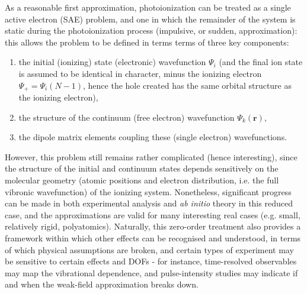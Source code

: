 \documentclass[10pt]{article}
\begin{document}
As a reasonable first approximation, photoionization can be treated as a single active electron (SAE) problem, and one in which the remainder of the system is static during the photoionization process (impulsive, or sudden, approximation): this allows the problem to be defined in terms terms of three key components: 

\begin{enumerate}
\item the initial (ionizing) state (electronic) wavefunction $\Psi_i$ (and the final ion state is assumed to be identical in character, minus the ionizing electron $\Psi_+ = \Psi_i(N-1)$, hence the hole created has the same orbital structure as the ionizing electron),
\item the structure of the continuum (free electron) wavefunction $\Psi_{k}(\bm{r})$,
\item the dipole matrix elements coupling these (single electron) wavefunctions.
\end{enumerate}


However, this problem still remains rather complicated (hence interesting), since the structure of the initial and continuum states depends sensitively on the molecular geometry (atomic positions and electron distribution, i.e. the full vibronic wavefunction) of the ionizing system. Nonetheless, significant progress can be made in both experimental analysis and \textit{ab initio} theory in this reduced case, and the approximations are valid for many interesting real cases (e.g. small, relatively rigid, polyatomics). Naturally, this zero-order treatment also provides a framework within which other effects can be recognised and understood, in terms of which physical assumptions are broken, and certain types of experiment may be sensitive to certain effects and DOFs - for instance, time-resolved observables may map the vibrational dependence, and pulse-intensity studies may indicate if and when the weak-field approximation breaks down.




\end{document}
